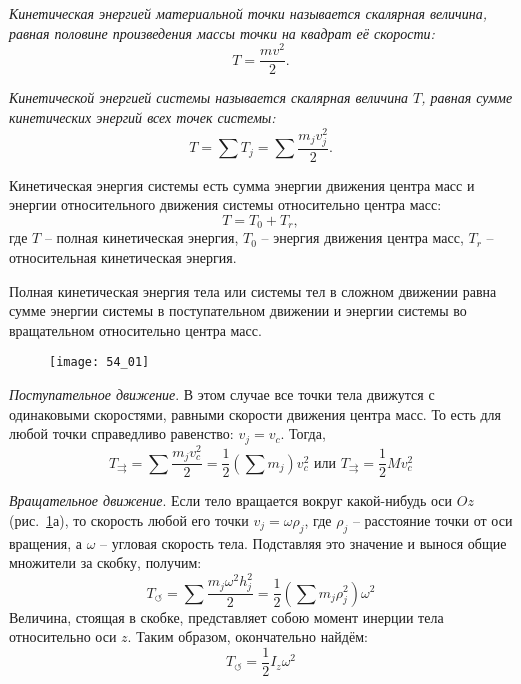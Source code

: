 

\emph{Кинетическая энергией материальной точки называется 
скалярная величина, равная половине произведения 
массы точки на квадрат её скорости:}
\[
	T = \frac{mv^2}{2}.
\]

\emph{Кинетической энергией системы называется скалярная величина 
\( T \), равная сумме кинетических энергий всех точек системы:}
\[
	T = \sum T_j = \sum\frac{m_j v^2_j}{2}.
\]

Кинетическая энергия системы есть сумма энергии движения центра масс и энергии 
относительного движения системы относительно центра масс:
\[
	T = T_0 + T_r,
\]
где \( T \) -- полная кинетическая энергия, \( T_0 \) -- энергия движения 
центра масс, \( T_r \) -- относительная кинетическая энергия.

Полная кинетическая энергия тела или системы тел в сложном движении равна 
сумме энергии системы в поступательном движении и энергии системы во 
вращательном относительно центра масс.


\begin{figure}[h!]
	\center
    \texttt{[image: 54\_01]}
    \caption{}
    \label{pic54_01}
\end{figure}

\emph{Поступательное движение}. В этом случае все точки тела движутся 
с одинаковыми скоростями, равными скорости движения центра масс. То есть 
для любой точки справедливо равенство: \( v_j = v_c \). Тогда, 
\[ 
	T_{\rightrightarrows} = \sum\frac{m_j v^2_c}{2} = 
	\frac{1}{2}\left( \sum m_j \right)v^2_c
	\text{ или }
	T_{\rightrightarrows} = \frac{1}{2}Mv^2_c
\]

\emph{Вращательное движение}. Если тело вращается вокруг какой-нибудь 
оси \( Oz \) (рис.~\ref{pic54_01}а), то скорость любой его точки 
\( v_j = \omega \rho_j \), где \( \rho_j \) -- расстояние точки от оси вращения, 
а \( \omega \) -- угловая скорость тела. Подставляя это значение и вынося 
общие множители за скобку, получим:
\[ 
	T_{\circlearrowleft} = \sum\frac{m_j \omega^2 h^2_j}{2} = 
	\frac{1}{2}\left( \sum m_j \rho^2_j \right)\omega^2
\]
Величина, стоящая в скобке, представляет собою момент инерции тела 
относительно оси \( z \). Таким образом, окончательно найдём:
\[ T_{\circlearrowleft} = \frac{1}{2}I_z \omega^2 \]

